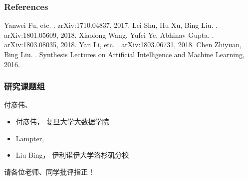 \documentclass{beamer}
\begin{document}
\begin{frame}[allowframebreaks]
  \frametitle<presentation>{References}    
  \begin{thebibliography}{10}    
  \beamertemplatearticlebibitems
    Yanwei Fu, etc.
    .
    \newblock zrXiv:1710.04837, 2017.
  \beamertemplatearticlebibitems
    Lei Shu, Hu Xu, Bing Liu.
    .
    \newblock arXiv:1801.05609, 2018.
  \beamertemplatearticlebibitems
   Xiaolong Wang, Yufei Ye, Abhinav Gupta.
   .
   \newblock arXiv:1803.08035, 2018.
 \beamertemplatearticlebibitems
      Yan Li, etc.
      .
      \newblock arXiv:1803.06731, 2018.
 \beamertemplatebookbibitems
      Chen Zhiyuan, Bing Liu.
      .
      \newblock Synthesis Lectures on Artificial Intelligence and Machine Learning, 2016.
  \end{thebibliography}
\end{frame}

\begin{frame}
\frametitle{研究课题组}
付彦伟、
\begin{itemize}
\item 付彦伟， 复旦大学大数据学院
\item Lampter, 
\item Liu Bing， 伊利诺伊大学洛杉矶分校
\end{itemize}

\end{frame}

\begin{frame}[plain]

{
\Large
\bfseries
\begin{center}
\color{orange}请各位\color{green}老师、同学\color{blue}批评指正！
\end{center}
}

\end{frame}
\end{document}
